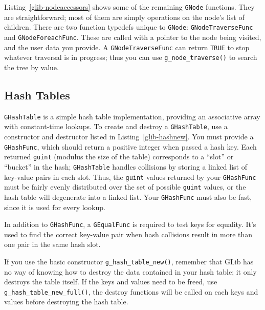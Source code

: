 Listing~\ref{glib-nodeaccessors} shows some of the remaining \lstinline{GNode} functions. They are straightforward; most of them are simply operations on the node's list of children. There are two function typedefs unique to \lstinline{GNode}: \lstinline{GNodeTraverseFunc} and \lstinline{GNodeForeachFunc}. These are called with a pointer to the node being visited, and the user data you provide. A \lstinline{GNodeTraverseFunc} can return \lstinline{TRUE} to stop whatever traversal is in progress; thus you can use \lstinline{g_node_traverse()} to search the tree by value.

\subsection{Hash Tables}

\lstinline{GHashTable} is a simple hash table implementation, providing an associative array with constant-time lookups. To create and destroy a \lstinline{GHashTable}, use a constructor and destructor listed in Listing~\ref{glib-hashnew}. You must provide a \lstinline{GHashFunc}, which should return a positive integer when passed a hash key. Each returned \lstinline{guint} (modulus the size of the table) corresponds to a ``slot'' or ``bucket'' in the hash; \lstinline{GHashTable} handles collisions by storing a linked list of key-value pairs in each slot. Thus, the \lstinline{guint} values returned by your \lstinline{GHashFunc} must be fairly evenly distributed over the set of possible \lstinline{guint} values, or the hash table will degenerate into a linked list. Your \lstinline{GHashFunc} must also be fast, since it is used for every lookup.

In addition to \lstinline{GHashFunc}, a \lstinline{GEqualFunc} is required to test keys for equality. It's used to find the correct key-value pair when hash collisions result in more than one pair in the same hash slot.

If you use the basic constructor \lstinline{g_hash_table_new()}, remember that GLib has no way of knowing how to destroy the data contained in your hash table; it only destroys the table itself. If the keys and values need to be freed, use \lstinline{g_hash_table_new_full()}, the destroy functions will be called on each keys and values before destroying the hash table.

